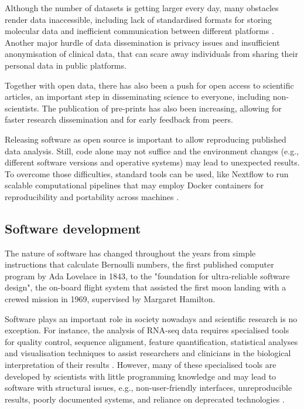 Although the number of datasets is getting larger every day, many obstacles render data inaccessible, including lack of standardised formats for storing molecular data and inefficient communication between different platforms \cite{rockhold:2019ws}. Another major hurdle of data dissemination is privacy issues and insufficient anonymisation of clinical data, that can scare away individuals from sharing their personal data in public platforms.

Together with open data, there has also been a push for open access to scientific articles, an important step in disseminating science to everyone, including non-scientists. The publication of pre-prints has also been increasing, allowing for faster research dissemination and for early feedback from peers.

Releasing software as open source is important to allow reproducing published data analysis. Still, code alone may not suffice and the environment changes (e.g., different software versions and operative systems) may lead to unexpected results. To overcome those difficulties, standard tools can be used, like Nextflow to run scalable computational pipelines that may employ Docker containers for reproducibility and portability across machines \cite{di-tommaso:2017vq}.

\subsection{Software development}

The nature of software has changed throughout the years from simple instructions that calculate Bernoulli numbers, the first published computer program by Ada Lovelace in 1843, to the "foundation for ultra-reliable software design", the on-board flight system that assisted the first moon landing with a crewed mission in 1969, supervised by Margaret Hamilton.

Software plays an important role in society nowadays and scientific research is no exception. For instance, the analysis of RNA-seq data requires specialised tools for quality control, sequence alignment, feature quantification, statistical analyses and visualisation techniques to assist researchers and clinicians in the biological interpretation of their results \cite{conesa:2016vw}. However, many of these specialised tools are developed by scientists with little programming knowledge and may lead to software with structural  issues, e.g., non-user-friendly interfaces, unreproducible results, poorly documented systems, and reliance on deprecated technologies \cite{storer:2017tr,silva:2017wl}.

